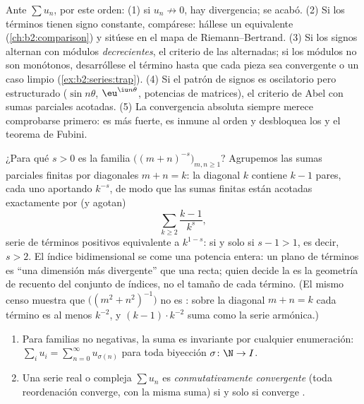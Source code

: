 \begin{method}\label{met:b2:series:choosing}
Ante $\sum u_n$, por este orden: (1) si $u_n \not\to 0$, hay
divergencia; se acabó. (2) Si los términos tienen signo constante,
compárese: hállese un equivalente (\cref{ch:b2:comparison}) y
sitúese en el mapa de Riemann--Bertrand. (3) Si los signos alternan
con módulos \emph{decrecientes}, el criterio de las alternadas; si
los módulos no son monótonos, desarróllese el término hasta que
cada pieza sea  convergente o un caso limpio
(\cref{ex:b2:series:trap}). (4) Si el patrón de signos es
oscilatorio pero estructurado ($\sin n\theta$, $\eu^{\iu
n\theta}$, potencias de matrices), el criterio de Abel con sumas
parciales acotadas. (5) La convergencia absoluta siempre merece
comprobarse primero: es más fuerte, es inmune al orden y desbloquea
los  y el teorema de Fubini.
\end{method}

\begin{example}\label{ex:b2:series:diagonalcount}
¿Para qué $s > 0$ es  la familia $\bigl((m +
n)^{-s}\bigr)_{m, n \geq 1}$? Agrupemos las sumas parciales finitas
por diagonales $m + n = k$: la diagonal $k$ contiene $k - 1$ pares,
cada uno aportando $k^{-s}$, de modo que las sumas finitas están
acotadas exactamente por (y agotan)
\[
\sum_{k \geq 2} \frac{k - 1}{k^{s}} ,
\]
serie de términos positivos equivalente a $k^{1-s}$:  si y
solo si $s - 1 > 1$, es decir, $s > 2$. El índice bidimensional se
come una potencia entera: un plano de términos es ``una dimensión
más divergente'' que una recta; quien decide la  es la
geometría de recuento del conjunto de índices, no el tamaño de cada
término. (El mismo censo muestra que $\bigl((m^2 +
n^2)^{-1}\bigr)$ no es : sobre la diagonal $m + n = k$ cada
término es al menos $k^{-2}$, y $(k-1)\cdot k^{-2}$ suma como la
serie armónica.)
\end{example}

\begin{theorem}\label{thm:b2:series:rearrangement}
\begin{enumerate}
  \item Para familias no negativas, la suma es invariante por
        cualquier enumeración: $\sum_{i} u_i = \sum_{n=0}^{\infty}
        u_{\sigma(n)}$ para toda biyección $\sigma \colon \N \to I$.
  \item Una serie real o compleja $\sum u_n$ es
        \emph{conmutativamente convergente} (toda reordenación
        converge, con la misma suma) si y solo si converge
        .
\end{enumerate}
\end{theorem}

